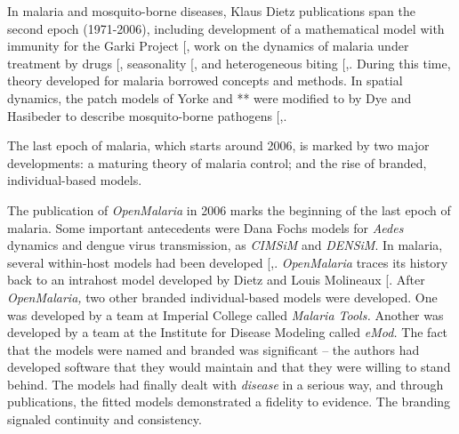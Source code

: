 \documentclass[
]{book}
\begin{document}
In malaria and mosquito-borne diseases, Klaus Dietz publications span the second epoch (1971-2006), including development of a mathematical model with immunity for the Garki Project {[}\citeproc{ref-DietzK1974GarkiModel}{65}{]}, work on the dynamics of malaria under treatment by drugs {[}\citeproc{ref-DietzK1975ModelsParasitic}{66}{]}, seasonality {[}\citeproc{ref-DietzK1976Seasonality}{67}{]}, and heterogeneous biting {[},\citeproc{ref-DietzK1988EpidemiologicalModels}{69}{]}. During this time, theory developed for malaria borrowed concepts and methods. In spatial dynamics, the patch models of Yorke and ** were modified to by Dye and Hasibeder to describe mosquito-borne pathogens {[},\citeproc{ref-HasibederG1988PopulationDynamics}{71}{]}.

The last epoch of malaria, which starts around 2006, is marked by two major developments: a maturing theory of malaria control; and the rise of branded, individual-based models.

The publication of \emph{OpenMalaria} in 2006 marks the beginning of the last epoch of malaria. Some important antecedents were Dana Fochs models for \emph{Aedes} dynamics and dengue virus transmission, as \emph{CIMSiM} and \emph{DENSiM}. In malaria, several within-host models had been developed {[},\citeproc{ref-MolineauxL2001PlasmodiumFalciparum}{73}{]}. \emph{OpenMalaria} traces its history back to an intrahost model developed by Dietz and Louis Molineaux {[}\citeproc{ref-MolineauxL2001PlasmodiumFalciparum}{73}{]}. After \emph{OpenMalaria,} two other branded individual-based models were developed. One was developed by a team at Imperial College called \emph{Malaria Tools.} Another was developed by a team at the Institute for Disease Modeling called \emph{eMod.} The fact that the models were named and branded was significant -- the authors had developed software that they would maintain and that they were willing to stand behind. The models had finally dealt with \emph{disease} in a serious way, and through publications, the fitted models demonstrated a fidelity to evidence. The branding signaled continuity and consistency.
\end{document}
